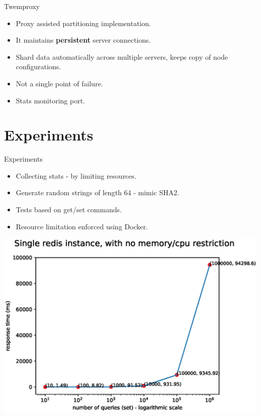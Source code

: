 \documentclass{beamer}
\begin{document}
\begin{frame}{Twemproxy}
\begin{itemize}
    \pause\item Proxy assisted partitioning implementation.
    \pause\item It maintains \textbf{persistent} server connections.
    \pause\item Shard data automatically across multiple servers, keeps copy of node configurations.
    \pause\item Not a single point of failure.
    \pause\item Stats monitoring port.
\end{itemize}
\end{frame}

\section{Experiments}

\begin{frame}{Experiments}
\begin{itemize}
    \pause\item Collecting stats - by limiting resources.
    \pause\item Generate random strings of length 64 - mimic SHA2.
    \pause\item Tests based on get/set commands.
    \pause\item Resource limitation enforced using Docker.
\end{itemize}
\end{frame}


\begin{frame}
    \includegraphics[width=\textwidth]{fig1.eps}
\end{frame}
\end{document}
